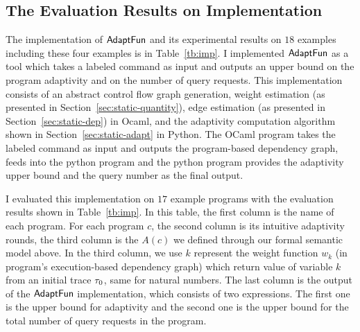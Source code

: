 \subsection{The Evaluation Results on Implementation}
\label{sec:adapt-impleval}
The implementation of $\textsf{AdaptFun}$ and its experimental 
results on $18$ examples including these four examples is in Table~\ref{tb:imp}.
I implemented $\textsf{AdaptFun}$ as a tool which takes a labeled command as input  
and outputs an upper bound on the program adaptivity and on the number of query requests.
This implementation consists of an 
abstract control flow graph generation, weight estimation (as presented in Section~\ref{sec:static-quantity}),
edge estimation (as presented in Section~\ref{sec:static-dep}) in Ocaml, 
and the adaptivity computation algorithm shown in Section~\ref{sec:static-adapt} in Python.
The OCaml program takes the labeled command as input and outputs the program-based dependency graph,
feeds into the python program and the python program provides the adaptivity upper bound and the query number as the final output.

I evaluated this implementation on $17$ example programs with the evaluation results shown  in Table~\ref{tb:imp}.
In this table,
the first column is the name of each program.
For each program $c$, the second column is its intuitive adaptivity rounds,
the third column is the $A(c)$ we defined through our formal semantic model above.
In the third column, we use $k$ represent the weight function $w_k$ (in program's execution-based dependency graph) which return value of variable $k$ 
from an initial trace $\mathtt{\tau}_0$, same for natural numbers.
The last column is the output of the $\textsf{AdaptFun}$ implementation, which consists of two expressions.
The first one is the upper bound for adaptivity and the second one is the 
upper bound for the total number of query requests in the program.

